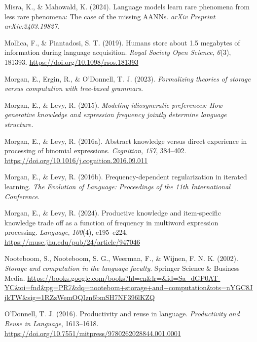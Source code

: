 \documentclass[
  12pt,
  letterpaper,
]{scrreport}
\newlength{\cslhangindent}
\newenvironment{CSLReferences}[2] %
 {\begin{list}{}{%
  \setlength{\itemindent}{0pt}
  \setlength{\leftmargin}{0pt}
  \setlength{\parsep}{0pt}
  \ifodd #1
   \setlength{\leftmargin}{\cslhangindent}
   \setlength{\itemindent}{-1\cslhangindent}
  \fi
  \setlength{\itemsep}{#2\baselineskip}}}
 {\end{list}}
\begin{document}
\begin{CSLReferences}{1}{0}
Misra, K., \& Mahowald, K. (2024). Language models learn rare phenomena
from less rare phenomena: The case of the missing AANNs. \emph{arXiv
Preprint arXiv:2403.19827}.

Mollica, F., \& Piantadosi, S. T. (2019). Humans store about 1.5
megabytes of information during language acquisition. \emph{Royal
Society Open Science}, \emph{6}(3), 181393.
\url{https://doi.org/10.1098/rsos.181393}

Morgan, E., Ergin, R., \& O'Donnell, T. J. (2023). \emph{Formalizing
theories of storage versus computation with tree-based grammars}.

Morgan, E., \& Levy, R. (2015). \emph{Modeling idiosyncratic
preferences: How generative knowledge and expression frequency jointly
determine language structure.}

Morgan, E., \& Levy, R. (2016a). Abstract knowledge versus direct
experience in processing of binomial expressions. \emph{Cognition},
\emph{157}, 384--402.
\url{https://doi.org/10.1016/j.cognition.2016.09.011}

Morgan, E., \& Levy, R. (2016b). Frequency-dependent regularization in
iterated learning. \emph{The Evolution of Language: Proceedings of the
11th International Conference}.

Morgan, E., \& Levy, R. (2024). Productive knowledge and item-specific
knowledge trade off as a function of frequency in multiword expression
processing. \emph{Language}, \emph{100}(4), e195--e224.
\url{https://muse.jhu.edu/pub/24/article/947046}

Nooteboom, S., Nooteboom, S. G., Weerman, F., \& Wijnen, F. N. K.
(2002). \emph{Storage and computation in the language faculty}. Springer
Science \& Business Media.
\url{https://books.google.com/books?hl=en&lr=&id=Sa_dGP0AT-YC&oi=fnd&pg=PR7&dq=nootebom+storage+and+computation&ots=nYGC8JjkTW&sig=1RZzWemOQIzn6bmSH7NF396lKZQ}

O'Donnell, T. J. (2016). Productivity and reuse in language.
\emph{Productivity and Reuse in Language}, 1613--1618.
\url{https://doi.org/10.7551/mitpress/9780262028844.001.0001}


\end{CSLReferences}
\end{document}
